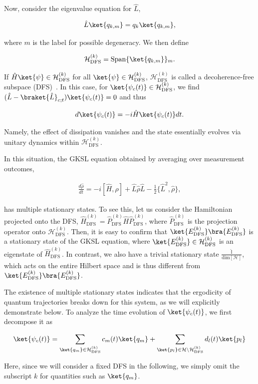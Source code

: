 \documentclass[preprint,pteplogo]{ptephy_v2}%
\numberwithin{equation}{section}
\theoremstyle{definition}
\newcommand{\ml}[1]{\mathcal{#1}}
\newcommand{\mr}[1]{\mathrm{#1}}
\newcommand{\mbb}[1]{\mathbb{#1}}
\newcommand{\aln}[1]{
\begin{align}
#1
\end{align}
}
\begin{document}
Now, consider the eigenvalue equation for $\hat{L}$,
\aln{
\hat{L}\ket{q_{k,m}}=q_k\ket{q_{k,m}},
}
where $m$ is the label for possible degeneracy.
We then define
\aln{\label{DFS}
\ml{H}_\mr{DFS}^{(k)}=\mr{Span}\{\ket{q_{k,m}}\}_m.
}
If $\hat{H}\ket{\psi}\in \ml{H}_\mr{DFS}^{(k)}$ for all $\ket{\psi}\in\ml{H}_\mr{DFS}^{(k)}$,
$\ml{H}_\mr{DFS}^{(k)}$ is called a decoherence-free subspace (DFS)~\cite{lidar1998decoherence, beige2000quantum}.
In this case, for $\ket{\psi_c(t)}\in \ml{H}_\mr{DFS}^{(k)}$, we find $(\hat{L}-\braket{\hat{L}}_{c;t})\ket{\psi_c(t)}=0$ and thus
\aln{
d\ket{\psi_c(t)}=-i\hat{H}\ket{\psi_c(t)}dt.
}
Namely, the effect of dissipation vanishes and the state essentially evolves via unitary dynamics within $\ml{H}_\mr{DFS}^{(k)}$.

In this situation, the GKSL equation obtained by averaging over measurement outcomes,
\aln{
\frac{d\hat{\rho}}{dt}=-i[\hat{H},\hat{\rho}]+\hat{L}\hat{\rho}\hat{L}-\frac{1}{2}\{\hat{L}^2,\hat{\rho}\},
}
has multiple stationary states.
To see this, let us consider the Hamiltonian projected onto the DFS, $\hat{H}_\mr{DFS}^{(k)}=\hat{P}_\mr{DFS}^{(k)}\hat{H}\hat{P}_\mr{DFS}^{(k)}$, where $\hat{P}_\mr{DFS}^{(k)}$ is the projection operator onto $\ml{H}_\mr{DFS}^{(k)}$.
Then, it is easy to confirm that $\ket{E_\mr{DFS}^{(k)}}\bra{E_\mr{DFS}^{(k)}}$ is a stationary state of the GKSL equation, where $\ket{E_\mr{DFS}^{(k)}}\in \ml{H}_\mr{DFS}^{(k)}$ is an eigenstate of $\hat{H}_\mr{DFS}^{(k)}$.
In contrast, we also have a trivial stationary state $\frac{\hat{\mbb{I}}}{\mr{dim}[\ml{H}]}$, which acts on the entire Hilbert space and is thus different from $\ket{E_\mr{DFS}^{(k)}}\bra{E_\mr{DFS}^{(k)}}$.

The existence of multiple stationary states indicates that the ergodicity of quantum trajectories breaks down for this system, as we will explicitly demonstrate below.
To analyze the time evolution of $\ket{\psi_c(t)}$, we first decompose it as~\cite{schmolke2024measurement}
\aln{
\ket{\psi_c(t)}=\sum_{\ket{q_m}\in\ml{H}_\mr{DFS}^{(k)}}c_m(t)\ket{q_m}+
\sum_{\ket{p_l}\in\ml{H}\backslash\ml{H}_\mr{DFS}^{(k)}}d_l(t)\ket{p_l}
}
Here, since we will consider a fixed DFS in the following, we simply omit the subscript $k$ for quantities such as $\ket{q_m}$.
\end{document}
